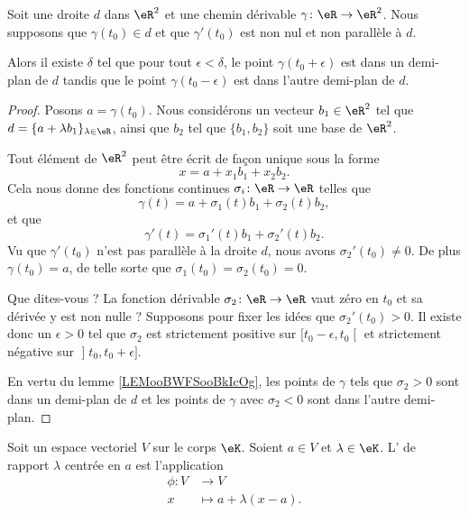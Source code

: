 \begin{proposition}     \label{PROPooTPHKooXnpJaV}
	Soit une droite \( d\) dans \( \eR^2\) et une chemin dérivable \( \gamma\colon \eR\to \eR^2\). Nous supposons que \( \gamma(t_0)\in d\) et que \( \gamma'(t_0)\) est non nul et non parallèle à \( d\).

	Alors il existe \( \delta\) tel que pour tout \( \epsilon<\delta\), le point \( \gamma(t_0+\epsilon)\) est dans un demi-plan de \( d\) tandis que le point \( \gamma(t_0-\epsilon)\) est dans l'autre demi-plan de \( d\).
\end{proposition}

\begin{proof}
	Posons \( a=\gamma(t_0)\). Nous considérons un vecteur \( b_1\in \eR^2\) tel que \( d=\{ a+\lambda b_1 \}_{\lambda\in \eR}\), ainsi que \( b_2\) tel que \( \{ b_1,b_2 \}\) soit une base de \( \eR^2\).

	Tout élément de \( \eR^2\) peut être écrit de façon unique sous la forme
	\begin{equation}
		x=a+x_1b_1+x_2b_2.
	\end{equation}
	Cela nous donne des fonctions continues \( \sigma_i\colon \eR\to \eR\) telles que
	\begin{equation}
		\gamma(t)=a+\sigma_1(t)b_1+\sigma_2(t)b_2,
	\end{equation}
	et que
	\begin{equation}
		\gamma'(t)=\sigma_1'(t)b_1+\sigma_2'(t)b_2.
	\end{equation}
	Vu que \( \gamma'(t_0)\) n'est pas parallèle à la droite \( d\), nous avons \( \sigma_2'(t_0)\neq 0\). De plus \( \gamma(t_0)=a\), de telle sorte que \( \sigma_1(t_0)=\sigma_2(t_0)=0\).

	Que dites-vous ? La fonction dérivable \( \sigma_2\colon \eR\to \eR\) vaut zéro en \( t_0\) et sa dérivée y est non nulle ? Supposons pour fixer les idées que \( \sigma_2'(t_0)>0\). Il existe donc un \( \epsilon>0\) tel que \( \sigma_2\) est strictement positive sur \( \mathopen[ t_0-\epsilon , t_0 \mathclose[\) et strictement négative sur \( \mathopen] t_0 , t_0+\epsilon \mathclose]\).

	En vertu du lemme \ref{LEMooBWFSooBkIcOg}, les points de \( \gamma\) tels que \( \sigma_2>0\) sont dans un demi-plan de \( d\) et les points de \( \gamma\) avec \( \sigma_2<0\) sont dans l'autre demi-plan.
\end{proof}

\begin{definition}	\label{DEFooIOALooFNlswL}
	Soit un espace vectoriel \( V\) sur le corps \( \eK\). Soient \( a\in V\) et \( \lambda\in \eK\). L' de rapport \( \lambda\) centrée en \( a\) est l'application
	\begin{equation}
		\begin{aligned}
			\phi\colon V & \to V                   \\
			x            & \mapsto a+\lambda(x-a).
		\end{aligned}
	\end{equation}
\end{definition}


